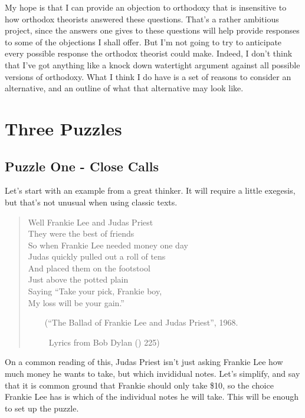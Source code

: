 \documentclass[
  11pt,
  letterpaper,
  DIV=11,
  numbers=noendperiod,
  twoside]{scrartcl}
\begin{document}
My hope is that I can provide an objection to orthodoxy that is
insensitive to how orthodox theorists answered these questions. That's a
rather ambitious project, since the answers one gives to these questions
will help provide responses to some of the objections I shall offer. But
I'm not going to try to anticipate every possible response the orthodox
theorist could make. Indeed, I don't think that I've got anything like a
knock down watertight argument against all possible versions of
orthodoxy. What I think I do have is a set of reasons to consider an
alternative, and an outline of what that alternative may look like.

\section{Three Puzzles}\label{three-puzzles}

\subsection{Puzzle One - Close Calls}\label{puzzle-one---close-calls}

Let's start with an example from a great thinker. It will require a
little exegesis, but that's not unusual when using classic texts.

\begin{quote}
Well Frankie Lee and Judas Priest\\
They were the best of friends\\
So when Frankie Lee needed money one day\\
Judas quickly pulled out a roll of tens\\
And placed them on the footstool\\
Just above the potted plain\\
Saying ``Take your pick, Frankie boy,\\
My loss will be your gain.''\\
\strut ~~~~(``The Ballad of Frankie Lee and Judas Priest'', 1968.\\
\strut ~~~~~Lyrics from Bob Dylan () 225)
\end{quote}

On a common reading of this, Judas Priest isn't just asking Frankie Lee
how much money he wants to take, but which invididual notes. Let's
simplify, and say that it is common ground that Frankie should only take
\$10, so the choice Frankie Lee has is which of the individual notes he
will take. This will be enough to set up the puzzle.
\end{document}
